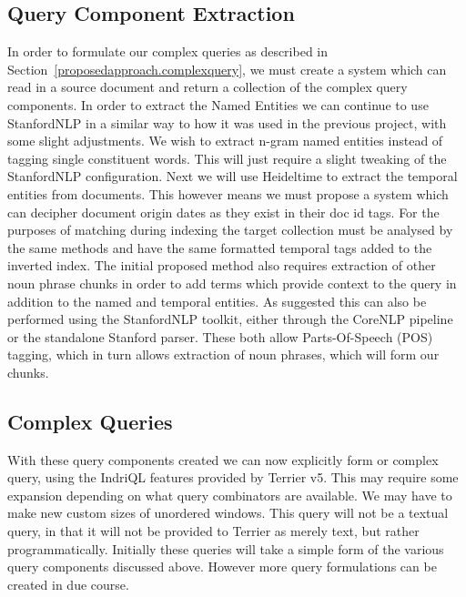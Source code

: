 \documentclass{mprop}
\begin{document}
\subsection{Query Component Extraction}
In order to formulate our complex queries as described in Section~\ref{proposedapproach.complexquery}, we must create a system which can read in a source document and return a collection of the complex query components. 
In order to extract the Named Entities we can continue to use StanfordNLP in a similar way to how it was used in the previous project, with some slight adjustments. 
We wish to extract n-gram named entities instead of tagging single constituent words. 
This will just require a slight tweaking of the StanfordNLP configuration. 
Next we will use Heideltime to extract the temporal entities from documents. 
This however means we must propose a system which can decipher document origin dates as they exist in their doc id tags. 
For the purposes of matching during indexing the target collection must be analysed by the same methods and have the same formatted temporal tags added to the inverted index. 
The initial proposed method also requires extraction of other noun phrase chunks in order to add terms which provide context to the query in addition to the named and temporal entities. 
As suggested this can also be performed using the StanfordNLP toolkit, either through the CoreNLP pipeline or the standalone Stanford parser. 
These both allow Parts-Of-Speech (POS) tagging, which in turn allows extraction of noun phrases, which will form our chunks.

\subsection{Complex Queries}
With these query components created we can now explicitly form or complex query, using the IndriQL features provided by Terrier v5. 
This may require some expansion depending on what query combinators are available. We may have to make new custom sizes of unordered windows. 
This query will not be a textual query, in that it will not be provided to Terrier as merely text, but rather programmatically. 
Initially these queries will take a simple form of the various query components discussed above. 
However more query formulations can be created in due course. 
\end{document}
